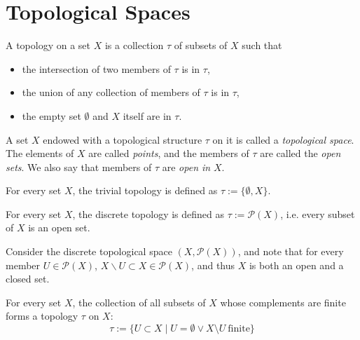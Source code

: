 \section{Topological Spaces}
\begin{defn}
	A topology on a set $X$ is a collection $\tau$ of subsets of $X$ such that 
	\begin{itemize}
		\item the intersection of two members of $\tau$ is in $\tau$, 
		\item the union of any collection of members of $\tau$ is in $\tau$, 
		\item the empty set $\emptyset$ and $X$ itself are in $\tau$.
	\end{itemize}
	A set $X$ endowed with a topological structure $\tau$ on it is called a \textit{topological space}. The elements of $X$ are called \textit{points}, and the members of $\tau$ are called the \textit{open sets}. We also say that members of $\tau$ are \textit{open in} $X$.
\end{defn} 

\begin{exmp}
	For every set $X$, the trivial topology is defined as $\tau := \{\emptyset, X\}$.
\end{exmp}

\begin{exmp}\label{exmp:discrete_topology}
	For every set $X$, the discrete topology is defined as $\tau := \mathcal P(X)$, i.e. every subset of $X$ is an open set.
\end{exmp}

\begin{remark}
	Consider the discrete topological space $(X, \mathscr P(X))$, and note that for every member $U\in \mathscr P(X)$, $X\backslash U\subset X\in \mathscr P(X)$, and thus $X$ is both an open and a closed set. 
\end{remark}

\begin{exmp}
	For every set $X$, the collection of all subsets of $X$ whose complements are finite forms a topology $\tau$ on $X$:
	$$\tau := \{ U\subset X\mid U = \emptyset \lor X\setminus U \ \text{finite} \}$$
\end{exmp}

